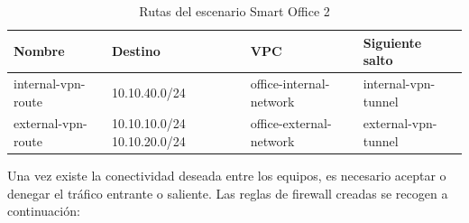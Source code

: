    \begin{table}[h]
    \begin{center}
      \begin{tabular}{ | m{} | m{3cm} | w{c}{4cm} | m{3,75cm} | }
        \hline{} \centering\textbf{Nombre} & \centering\textbf{Destino} & \textbf{VPC} & \textbf{Siguiente salto} \\ \hline 
        internal-vpn-route & 10.10.40.0/24 & office-internal-network & internal-vpn-tunnel \\ \hline{}
        external-vpn-route & 10.10.10.0/24 10.10.20.0/24 & office-external-network & external-vpn-tunnel \\ \hline
      \end{tabular}
      \caption{Rutas del escenario Smart Office 2}
      \label{tab:rut2}
    \end{center}
  \end{table}

  Una vez existe la conectividad deseada entre los equipos, es necesario aceptar o denegar el tráfico entrante o saliente. Las reglas de firewall creadas se recogen a continuación:

